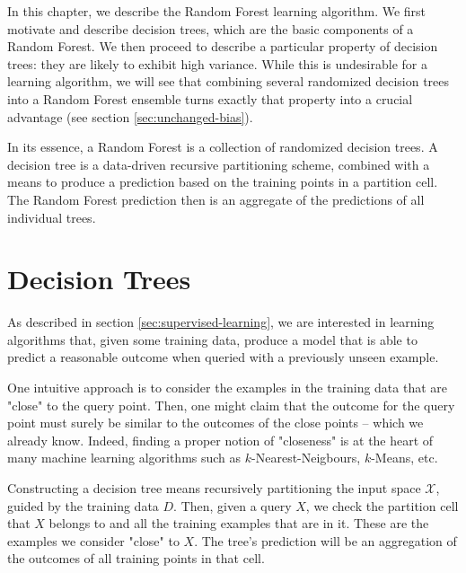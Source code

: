 \documentclass[../main.tex]{subfiles}
\begin{document}
In this chapter, we describe the Random Forest learning algorithm. We first motivate and describe decision trees, which are the basic components of a Random Forest. We then proceed to describe a particular property of decision trees: they are likely to exhibit high variance. While this is undesirable for a learning algorithm, we will see that combining several randomized decision trees into a Random Forest ensemble turns exactly that property into a crucial advantage (see section \ref{sec:unchanged-bias}).

In its essence, a Random Forest is a collection of randomized decision trees. A decision tree is a data-driven recursive partitioning scheme, combined with a means to produce a prediction based on the training points in a partition cell. The Random Forest prediction then is an aggregate of the predictions of all individual trees.

\section{Decision Trees}
\label{sec:decision-trees}

As described in section \ref{sec:supervised-learning}, we are interested in learning algorithms that, given some training data, produce a model that is able to predict a reasonable outcome when queried with a previously unseen example. 


One intuitive approach is to consider the examples in the training data that are "close" to the query point. Then, one might claim that the outcome for the query point must surely be similar to the outcomes of the close points -- which we already know. Indeed, finding a proper notion of "closeness" is at the heart of many machine learning algorithms such as $k$-Nearest-Neigbours, $k$-Means, etc.

Constructing a decision tree means recursively partitioning the input space $\mathcal{X}$, guided by the training data $D$. Then, given a query $X$, we check the partition cell that $X$ belongs to
 and all the training examples that are in it. These are the examples we consider "close" to $X$. The tree's prediction will be an aggregation of the outcomes of all training points in that cell. 
\end{document}
